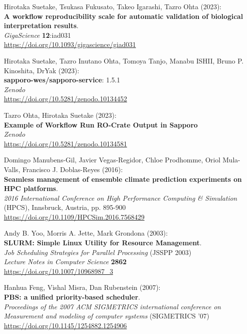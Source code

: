 \documentclass[10pt,letterpaper]{article}
\begin{document}
\begin{thebibliography}{10}
\begin{small}
 Hirotaka Suetake, Tsukasa Fukusato, Takeo Igarashi, Tazro Ohta (2023):\\
\textbf{A workflow reproducibility scale for automatic validation of biological interpretation results}.\\
\emph{GigaScience} \textbf{12}:iad031\\
\url{https://doi.org/10.1093/gigascience/giad031}

Hirotaka Suetake, Tazro Inutano Ohta, Tomoya Tanjo, Manabu ISHII, Bruno P. Kinoshita, DrYak (2023):\\
\textbf{sapporo-wes/sapporo-service}: 1.5.1\\
\emph{Zenodo}\\
\url{https://doi.org/10.5281/zenodo.10134452}

Tazro Ohta, Hirotaka Suetake (2023):\\
\textbf{Example of Workflow Run RO-Crate Output in Sapporo}\\
\emph{Zenodo}\\
\url{https://doi.org/10.5281/zenodo.10134581}


Domingo Manubens-Gil, Javier Vegas-Regidor, Chloe Prodhomme, Oriol Mula-Valls, Francisco J. Doblas-Reyes (2016):\\
\textbf{Seamless management of ensemble climate prediction experiments on HPC platforms}.\\
\emph{2016 International Conference on High Performance Computing & Simulation} (HPCS), Innsbruck, Austria, pp. 895-900 \\
\url{https://doi.org/10.1109/HPCSim.2016.7568429}

Andy B. Yoo, Morris A. Jette, Mark Grondona (2003):\\
\textbf{SLURM: Simple Linux Utility for Resource Management}.\\
\emph{Job Scheduling Strategies for Parallel Processing} (JSSPP 2003)\\
\emph{Lecture Notes in Computer Science} \textbf{2862}\\
\url{https://doi.org/10.1007/10968987_3}


Hanhua Feng, Vishal Misra, Dan Rubenstein (2007):\\
\textbf{PBS: a unified priority-based scheduler}.\\
\emph{Proceedings of the 2007 ACM SIGMETRICS international conference on Measurement and modeling of computer systems} (SIGMETRICS '07)\\
\url{https://doi.org/10.1145/1254882.1254906} 




\end{small}
\end{thebibliography}
\end{document}
